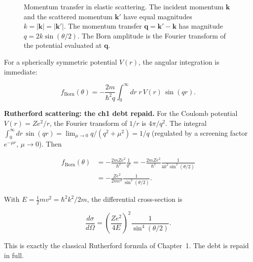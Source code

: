 \begin{figure}[htbp!]
\centering
{}
\caption{Momentum transfer in elastic scattering. The incident momentum $\bm k$ and the scattered momentum $\bm k'$ have equal magnitudes $k=|\bm k|=|\bm k'|$. The momentum transfer $\bm q = \bm k' - \bm k$ has magnitude $q = 2k\sin(\theta/2)$. The Born amplitude is the Fourier transform of the potential evaluated at $\bm q$.}
\label{fig:momentum-transfer}
\end{figure}

For a spherically symmetric potential $V(r)$, the angular integration is immediate:
\begin{linenomath}
\begin{equation}
f_{\text{Born}}(\theta)=-\frac{2m}{\hbar^{2}q}\int_{0}^{\infty}dr\;r\,V(r)\,\sin(qr).
\label{eq:born-spherical}
\end{equation}
\end{linenomath}

\medskip\noindent\textbf{Rutherford scattering: the ch1 debt repaid.}
For the Coulomb potential $V(r)=Ze^{2}/r$, the Fourier transform of $1/r$ is $4\pi/q^{2}$. The integral $\int_{0}^{\infty}dr\,\sin(qr)=\lim_{\mu\to0}q/(q^{2}+\mu^{2})=1/q$ (regulated by a screening factor $e^{-\mu r}$, $\mu\to0$). Then
\begin{linenomath}
\begin{align}
f_{\text{Born}}(\theta)&=-\frac{2mZe^{2}}{\hbar^{2}}\frac{1}{q^{2}}=-\frac{2mZe^{2}}{\hbar^{2}}\frac{1}{4k^{2}\sin^{2}(\theta/2)}\nonumber\\
&=-\frac{Ze^{2}}{2mv^{2}}\frac{1}{\sin^{2}(\theta/2)}.
\end{align}
\end{linenomath}
With $E=\tfrac12 mv^{2}=\hbar^{2}k^{2}/2m$, the differential cross-section is
\begin{linenomath}
\begin{equation}
\frac{d\sigma}{d\Omega}=\left(\frac{Ze^{2}}{4E}\right)^{2}\frac{1}{\sin^{4}(\theta/2)}.
\label{eq:rutherford-cross-section}
\end{equation}
\end{linenomath}
This is exactly the classical Rutherford formula of Chapter~1. The debt is repaid in full.

